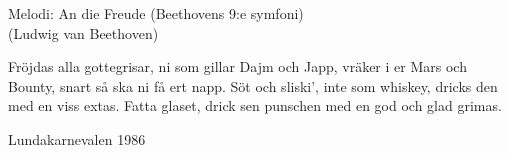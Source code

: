 \begin{song}

\begin{songmeta}
Melodi: An die Freude (Beethovens 9:e symfoni) \\ (Ludwig van Beethoven)
\end{songmeta}

\begin{songtext}
Fröjdas alla gottegrisar,
ni som gillar Dajm och Japp,
vräker i er Mars och Bounty,
snart så ska ni få ert napp.
Söt och sliski',
inte som whiskey,
dricks den med en viss extas.
Fatta glaset, drick sen punschen
med en god och glad grimas.
\end{songtext}

\begin{songnotes}
Lundakarnevalen 1986
\end{songnotes}

\end{song}

